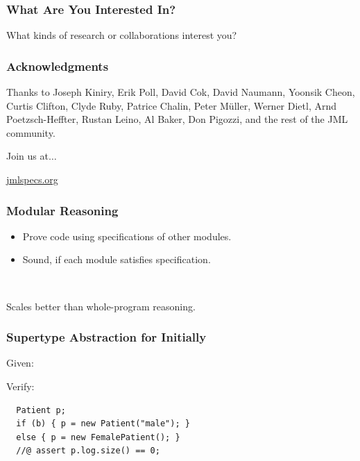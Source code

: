 \begin{frame}
\frametitle{What Are You Interested In?}

\begin{question}
What kinds of research or collaborations interest you?
\end{question}
\end{frame}


\begin{frame}
\frametitle{Acknowledgments}
Thanks to Joseph Kiniry, Erik Poll, David Cok, David Naumann, 
Yoonsik Cheon, Curtis Clifton, Clyde Ruby, Patrice Chalin,
Peter M\"{u}ller, Werner Dietl,
Arnd Poetzsch-Heffter,
Rustan Leino, 
Al Baker, Don Pigozzi,
and
the rest of the JML community.

Join us at$\ldots$

\begin{center}
\href{https://www.jmlspecs.org/}{jmlspecs.org}
\end{center}
\end{frame}


\appendix



\begin{frame}
\frametitle{Modular Reasoning}
\begin{itemize}
\item
Prove code using specifications of other modules.

\item
Sound, if each module satisfies specification.
\end{itemize}

~ 

Scales better than whole-program reasoning.
\end{frame}

\begin{frame}[fragile]
\frametitle{Supertype Abstraction for Initially}
Given:


Verify:
\begin{lstlisting}
  Patient p;
  if (b) { p = new Patient("male"); }
  else { p = new FemalePatient(); }
  //@ assert p.log.size() == 0;
\end{lstlisting}
\end{frame}


